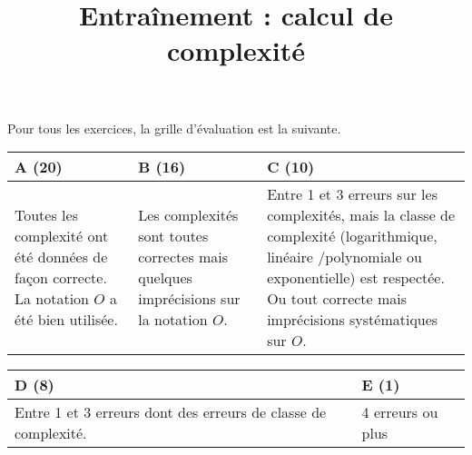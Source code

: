 \documentclass{../cours}
\title{Entraînement : calcul de complexité}
\begin{document}
Pour tous les exercices, la grille d'évaluation est la suivante.

\begin{tabular}{|p{5cm}|p{5cm}|p{5cm}|}
\hline 
A (20) & B (16) & C (10) \\ \hline
\small{Toutes les complexité ont été données de façon correcte. La notation $O$ a été bien utilisée.}
&
\small{Les complexités sont toutes correctes mais quelques imprécisions sur la notation $O$.}
&
\small{Entre 1 et 3 erreurs sur les complexités, mais la classe de complexité (logarithmique, linéaire /polynomiale ou exponentielle) est respectée. Ou tout correcte mais imprécisions systématiques sur $O$.}

\\ \hline

\end{tabular}

\begin{tabular}{|p{5cm}|p{5cm}|}
\hline
 D (8) & E (1) \\ \hline
\small{Entre 1 et 3 erreurs dont des erreurs de classe de complexité.}
&
\small{4 erreurs ou plus}
\\ \hline
\end{tabular}


\end{document}
